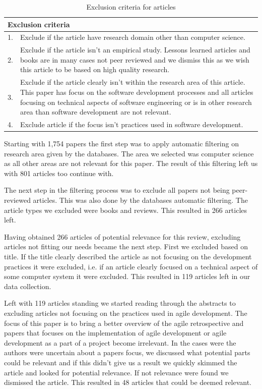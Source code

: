 \documentclass[12pt]{article}
\begin{document}
\begin{table}[h!]
	\begin{center}
		\caption{Exclusion criteria for articles}
		\label{table:datacriteria}
		\begin{tabular}{l p{}}
		 	\multicolumn{2}{l}{Exclusion criteria}\\
		 	\hline
			1. & Exclude if the article have research domain other than computer science. \\
			2. & Exclude if the article isn't an empirical study. Lessons learned articles and books are in many cases not peer reviewed and we dismiss this as we wish this article to be based on high quality research. \\
			3. & Exclude if the article clearly isn't within the research area of this article. This paper has focus on the software development processes and all articles focusing on technical aspects of software engineering or is in other research area than software development are not relevant. \\
			4. & Exclude article if the focus isn't practices used in software development. \\
		\end{tabular}
	\end{center}
\end{table}

Starting with 1,754 papers the first step was to apply automatic filtering on research area given by the databases. The area we selected was computer science as all other areas are not relevant for this paper. The result of this filtering left us with 801 articles too continue with. 

The next step in the filtering process was to exclude all papers not being peer-reviewed articles. This was also done by the databases automatic filtering. The article types we excluded were books and reviews. This resulted in 266 articles left. 

Having obtained 266 articles of potential relevance for this review, excluding articles not fitting our needs became the next step. First we excluded based on title. If the title clearly described the article as not focusing on the development practices it were excluded, i.e. if an article clearly focused on a technical aspect of some computer system it were excluded. This resulted in 119 articles left in our data collection. 

Left with 119 articles standing we started reading through the abstracts to excluding articles not focusing on the practices used in agile development. The focus of this paper is to bring a better overview of the agile retrospective and papers that focuses on the implementation of agile development or agile development as a part of a project become irrelevant. In the cases were the authors were uncertain about a papers focus, we discussed what potential parts could be relevant and if this didn't give us a result we quickly skimmed the article and looked for potential relevance. If not relevance were found we dismissed the article. This resulted in 48 articles that could be deemed relevant. 
\end{document}
